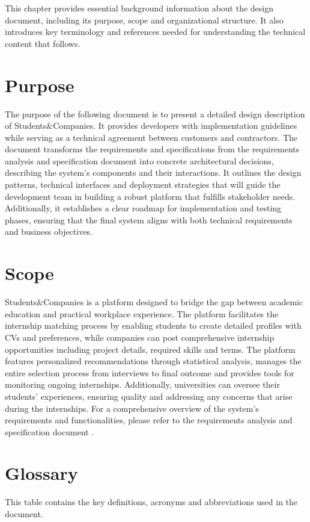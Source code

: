 This chapter provides essential background information about the design document, including its purpose, scope and organizational structure.
It also introduces key terminology and references needed for understanding the technical content that follows.

\section{Purpose}
The purpose of the following document is to present a detailed design description of Students\&Companies.
It provides developers with implementation guidelines while serving as a technical agreement between customers and contractors.
The document transforms the requirements and specifications from the requirements analysis and specification document \cite{carraracurrodossi2024} into concrete architectural decisions, describing the system's components and their interactions.
It outlines the design patterns, technical interfaces and deployment strategies that will guide the development team in building a robust platform that fulfills stakeholder needs.
Additionally, it establishes a clear roadmap for implementation and testing phases, ensuring that the final system aligns with both technical requirements and business objectives.

\section{Scope}
Students\&Companies is a platform designed to bridge the gap between academic education and practical workplace experience.
The platform facilitates the internship matching process by enabling students to create detailed profiles with CVs and preferences, while companies can post comprehensive internship opportunities including project details, required skills and terms.
The platform features personalized recommendations through statistical analysis, manages the entire selection process from interviews to final outcome and provides tools for monitoring ongoing internships.
Additionally, universities can oversee their students' experiences, ensuring quality and addressing any concerns that arise during the internships.
For a comprehensive overview of the system's requirements and functionalities, please refer to the requirements analysis and specification document \cite{carraracurrodossi2024}.

\section{Glossary}
This table contains the key definitions, acronyms and abbreviations used in the document.

